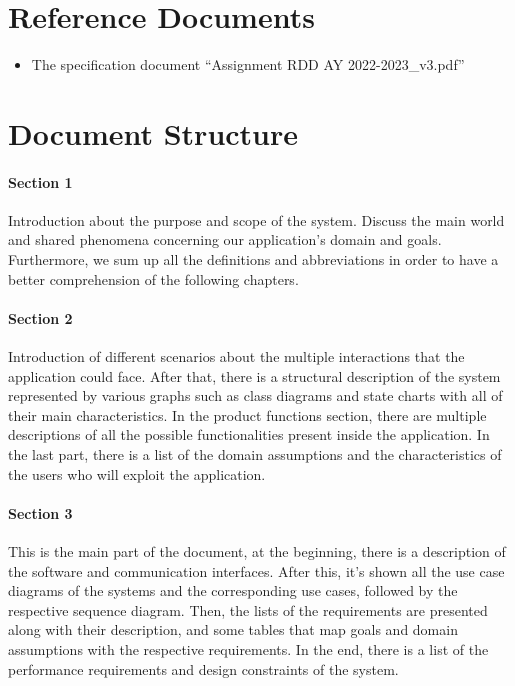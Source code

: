 \section{Reference Documents} %
\label{sec:referenceDocuments}
\begin{itemize}
\item  The specification document “Assignment RDD AY 2022-2023\_v3.pdf”
\end{itemize}


\section{Document Structure}
\label{sec:documentStructure}
\paragraph{Section 1}
Introduction about the purpose and scope of the system. Discuss the main world and shared phenomena concerning our application’s domain and goals. Furthermore, we sum up all the definitions and abbreviations in order to have a better comprehension of the following chapters.
\paragraph{Section 2}
Introduction of different scenarios about the multiple interactions that the application could face. After that, there is a structural description of the system represented by various graphs such as class diagrams and state charts with all of their main characteristics. In the product functions section, there are multiple descriptions of all the possible functionalities present inside the application. In the last part, there is a list of the domain assumptions and the
characteristics of the users who will exploit the application.
\paragraph{Section 3}
This is the main part of the document, at the beginning, there is a description of the software and communication interfaces. After this, it’s shown all the use case diagrams of the systems and the corresponding use cases, followed by the respective sequence diagram. Then, 
the lists of the requirements are presented along with their description, and some tables that map goals and domain assumptions with the respective requirements.  In the end, there is a list of the performance requirements and design constraints of the system.
